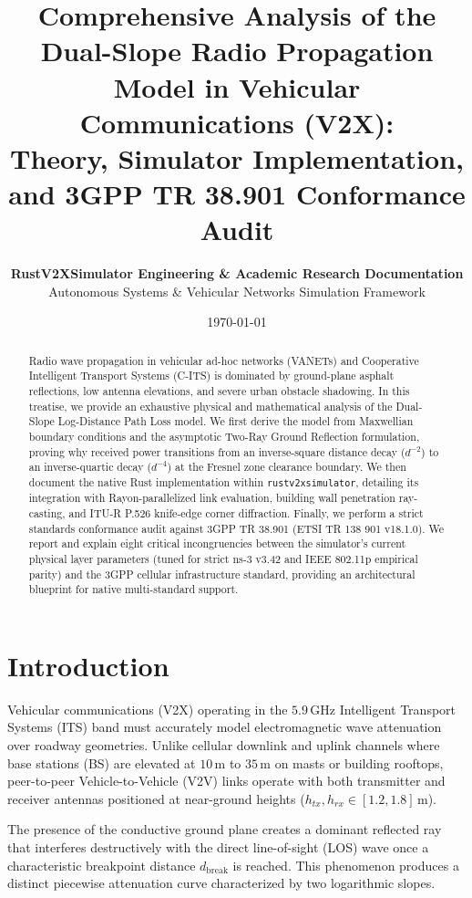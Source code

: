 \documentclass[11pt,a4paper]{article}
\title{\textbf{Comprehensive Analysis of the Dual-Slope Radio Propagation Model in Vehicular Communications (V2X):\\
Theory, Simulator Implementation, and 3GPP TR 38.901 Conformance Audit}}
\author{
    \textbf{RustV2XSimulator Engineering \& Academic Research Documentation} \\
    Autonomous Systems \& Vehicular Networks Simulation Framework
}
\date{\today}
\begin{document}
\maketitle

\begin{abstract}
Radio wave propagation in vehicular ad-hoc networks (VANETs) and Cooperative Intelligent Transport Systems (C-ITS) is dominated by ground-plane asphalt reflections, low antenna elevations, and severe urban obstacle shadowing. In this treatise, we provide an exhaustive physical and mathematical analysis of the Dual-Slope Log-Distance Path Loss model. We first derive the model from Maxwellian boundary conditions and the asymptotic Two-Ray Ground Reflection formulation, proving why received power transitions from an inverse-square distance decay ($d^{-2}$) to an inverse-quartic decay ($d^{-4}$) at the Fresnel zone clearance boundary. We then document the native Rust implementation within \texttt{rustv2xsimulator}, detailing its integration with Rayon-parallelized link evaluation, building wall penetration ray-casting, and ITU-R P.526 knife-edge corner diffraction. Finally, we perform a strict standards conformance audit against 3GPP TR 38.901 (ETSI TR 138 901 v18.1.0). We report and explain eight critical incongruencies between the simulator's current physical layer parameters (tuned for strict ns-3 v3.42 and IEEE 802.11p empirical parity) and the 3GPP cellular infrastructure standard, providing an architectural blueprint for native multi-standard support.
\end{abstract}

\section{Introduction}
Vehicular communications (V2X) operating in the $5.9\,\text{GHz}$ Intelligent Transport Systems (ITS) band must accurately model electromagnetic wave attenuation over roadway geometries. Unlike cellular downlink and uplink channels where base stations (BS) are elevated at $10\,\text{m}$ to $35\,\text{m}$ on masts or building rooftops, peer-to-peer Vehicle-to-Vehicle (V2V) links operate with both transmitter and receiver antennas positioned at near-ground heights ($h_{tx}, h_{rx} \in [1.2, 1.8]\,\text{m}$).

The presence of the conductive ground plane creates a dominant reflected ray that interferes destructively with the direct line-of-sight (LOS) wave once a characteristic breakpoint distance $d_{\text{break}}$ is reached. This phenomenon produces a distinct piecewise attenuation curve characterized by two logarithmic slopes.
\end{document}
